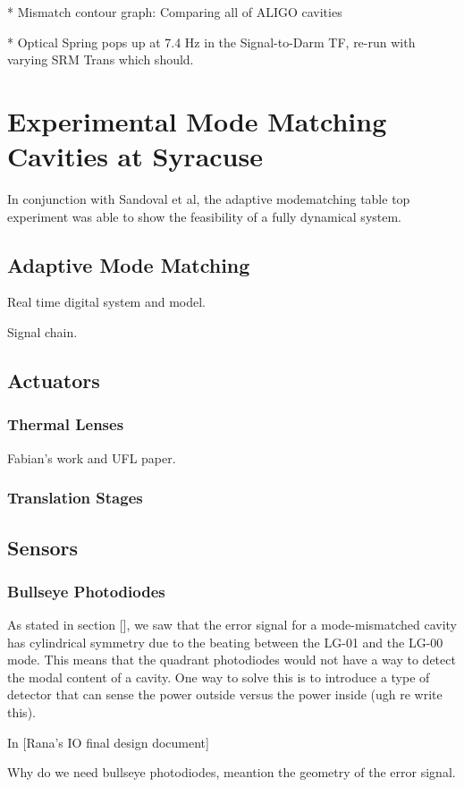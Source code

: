 \documentclass[oneside]{book}
\begin{document}
		* Mismatch contour graph: Comparing all of ALIGO cavities
		
		* Optical Spring pops up at 7.4 Hz in the Signal-to-Darm TF, re-run with varying SRM Trans which should.

\chapter{Experimental Mode Matching Cavities at Syracuse}
In conjunction with Sandoval et al, the adaptive modematching table top experiment was able to show the feasibility of a fully dynamical system.
	\section{Adaptive Mode Matching}
	Real time digital system and model.
	
	Signal chain.
	
	\section{Actuators}
		\subsection{Thermal Lenses}
		Fabian's work and UFL paper.
		\subsection{Translation Stages}
		
	\section{Sensors}
		\subsection{Bullseye Photodiodes}
		As stated in section [], we saw that the error signal for a mode-mismatched cavity has cylindrical symmetry due to the beating between the LG-01 and the LG-00 mode.  This means that the quadrant photodiodes would not have a way to detect the modal content of a cavity.  One way to solve this is to introduce a type of detector that can sense the power outside versus the power inside (ugh re write this).
		
		In [Rana's IO final design document] 
		
		
		Why do we need bullseye photodiodes, meantion the geometry of the error signal.
		
\end{document}
